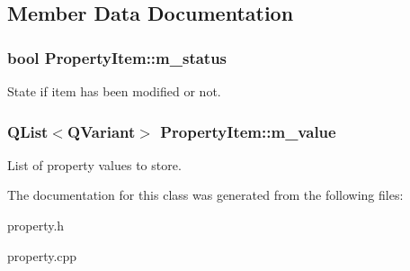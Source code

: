 \subsection{Member Data Documentation}
\hypertarget{classPropertyItem_a464bcb9ada09b86548daa191c9225ead}{
\subsubsection[{m\-\_\-status}]{\setlength{\rightskip}{0pt plus 5cm}bool Property\-Item\-::m\-\_\-status\hspace{0.3cm}{\ttfamily [private]}}}\label{classPropertyItem_a464bcb9ada09b86548daa191c9225ead}
State if item has been modified or not. \hypertarget{classPropertyItem_aa9c03a1e9828de471e73df1d30e4abdb}{
\subsubsection[{m\-\_\-value}]{\setlength{\rightskip}{0pt plus 5cm}Q\-List$<$Q\-Variant$>$ Property\-Item\-::m\-\_\-value\hspace{0.3cm}{\ttfamily [private]}}}\label{classPropertyItem_aa9c03a1e9828de471e73df1d30e4abdb}
List of property values to store. 

The documentation for this class was generated from the following files\-:\begin{DoxyCompactItemize}
\item 
property.\-h\item 
property.\-cpp\end{DoxyCompactItemize}
